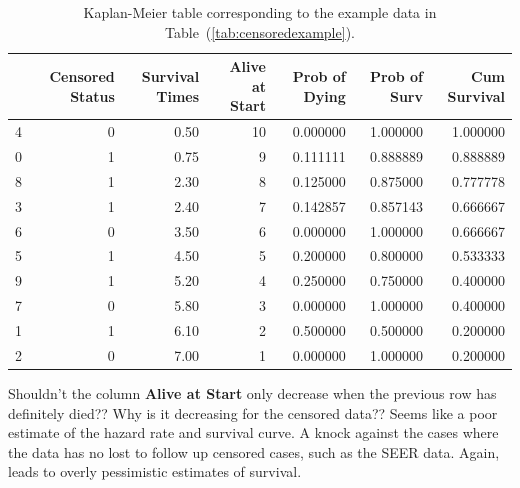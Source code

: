 \documentclass[a4paper,11pt]{article}
\begin{document}
\begin{table}[tbp]
\begin{center}
\begin{tabular}{lrrrrrr}
\toprule
{} &  Censored Status &  Survival Times &  Alive at Start &  Prob of Dying &  Prob of Surv &  Cum Survival \\
\midrule
4 &                0 &            0.50 &              10 &       0.000000 &      1.000000 &      1.000000 \\
0 &                1 &            0.75 &               9 &       0.111111 &      0.888889 &      0.888889 \\
8 &                1 &            2.30 &               8 &       0.125000 &      0.875000 &      0.777778 \\
3 &                1 &            2.40 &               7 &       0.142857 &      0.857143 &      0.666667 \\
6 &                0 &            3.50 &               6 &       0.000000 &      1.000000 &      0.666667 \\
5 &                1 &            4.50 &               5 &       0.200000 &      0.800000 &      0.533333 \\
9 &                1 &            5.20 &               4 &       0.250000 &      0.750000 &      0.400000 \\
7 &                0 &            5.80 &               3 &       0.000000 &      1.000000 &      0.400000 \\
1 &                1 &            6.10 &               2 &       0.500000 &      0.500000 &      0.200000 \\
2 &                0 &            7.00 &               1 &       0.000000 &      1.000000 &      0.200000 \\
\bottomrule
\end{tabular}
\caption{\label{tab:kaplanexample} Kaplan-Meier table corresponding to the example data in Table~(\ref{tab:censoredexample}).}
\end{center}
\end{table}


Shouldn't the column \textbf{Alive at Start} only decrease when the previous row has definitely died?? Why is it decreasing for the censored data?? Seems like a poor estimate of the hazard rate and survival curve. A knock against the cases where the data has no lost to follow up censored cases, such as the SEER data. Again, leads to overly pessimistic estimates of survival.


\end{document}
